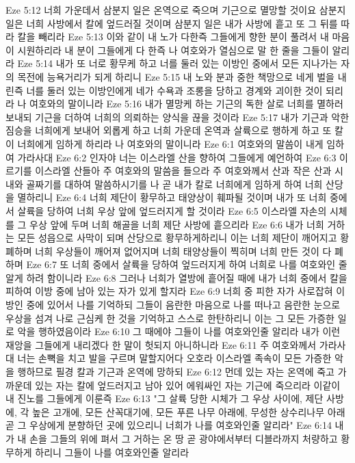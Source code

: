 Eze 5:12  너희 가운데서 삼분지 일은 온역으로 죽으며 기근으로 멸망할 것이요 삼분지 일은 너희 사방에서 칼에 엎드러질 것이며 삼분지 일은 내가 사방에 흩고 또 그 뒤를 따라 칼을 빼리라
Eze 5:13  이와 같이 내 노가 다한즉 그들에게 향한 분이 풀려서 내 마음이 시원하리라 내 분이 그들에게 다 한즉 나 여호와가 열심으로 말 한 줄을 그들이 알리라
Eze 5:14  내가 또 너로 황무케 하고 너를 둘러 있는 이방인 중에서 모든 지나가는 자의 목전에 능욕거리가 되게 하리니
Eze 5:15  내 노와 분과 중한 책망으로 네게 벌을 내린즉 너를 둘러 있는 이방인에게 네가 수욕과 조롱을 당하고 경계와 괴이한 것이 되리라 나 여호와의 말이니라
Eze 5:16  내가 멸망케 하는 기근의 독한 살로 너희를 멸하러 보내되 기근을 더하여 너희의 의뢰하는 양식을 끊을 것이라
Eze 5:17  내가 기근과 악한 짐승을 너희에게 보내어 외롭게 하고 너희 가운데 온역과 살륙으로 행하게 하고 또 칼이 너희에게 임하게 하리라 나 여호와의 말이니라
Eze 6:1  여호와의 말씀이 내게 임하여 가라사대
Eze 6:2  인자야 너는 이스라엘 산을 향하여 그들에게 예언하여
Eze 6:3  이르기를 이스라엘 산들아 주 여호와의 말씀을 들으라 주 여호와께서 산과 작은 산과 시내와 골짜기를 대하여 말씀하시기를 나 곧 내가 칼로 너희에게 임하게 하여 너희 산당을 멸하리니
Eze 6:4  너희 제단이 황무하고 태양상이 훼파될 것이며 내가 또 너희 중에서 살륙을 당하여 너희 우상 앞에 엎드러지게 할 것이라
Eze 6:5  이스라엘 자손의 시체를 그 우상 앞에 두며 너희 해골을 너희 제단 사방에 흩으리라
Eze 6:6  내가 너희 거하는 모든 성읍으로 사막이 되며 산당으로 황무하게하리니 이는 너희 제단이 깨어지고 황폐하며 너희 우상들이 깨어져 없어지며 너희 태양상들이 찍히며 너희 만든 것이 다 폐하며
Eze 6:7  또 너희 중에서 살륙을 당하여 엎드러지게 하여 너희로 나를 여호와인 줄 알게 하려 함이니라
Eze 6:8  그러나 너희가 열방에 흩어질 때에 내가 너희 중에서 칼을 피하여 이방 중에 남아 있는 자가 있게 할지라
Eze 6:9  너희 중 피한 자가 사로잡혀 이방인 중에 있어서 나를 기억하되 그들이 음란한 마음으로 나를 떠나고 음란한 눈으로 우상을 섬겨 나로 근심케 한 것을 기억하고 스스로 한탄하리니 이는 그 모든 가증한 일로 악을 행하였음이라
Eze 6:10  그 때에야 그들이 나를 여호와인줄 알리라 내가 이런 재앙을 그들에게 내리겠다 한 말이 헛되지 아니하니라
Eze 6:11  주 여호와께서 가라사대 너는 손뼉을 치고 발을 구르며 말할지어다 오호라 이스라엘 족속이 모든 가증한 악을 행하므로 필경 칼과 기근과 온역에 망하되
Eze 6:12  먼데 있는 자는 온역에 죽고 가까운데 있는 자는 칼에 엎드러지고 남아 있어 에워싸인 자는 기근에 죽으리라 이같이 내 진노를 그들에게 이룬즉
Eze 6:13  "그 살륙 당한 시체가 그 우상 사이에, 제단 사방에, 각 높은 고개에, 모든 산꼭대기에, 모든 푸른 나무 아래에, 무성한 상수리나무 아래 곧 그 우상에게 분향하던 곳에 있으리니 너희가 나를 여호와인줄 알리라"
Eze 6:14  내가 내 손을 그들의 위에 펴서 그 거하는 온 땅 곧 광야에서부터 디블라까지 처량하고 황무하게 하리니 그들이 나를 여호와인줄 알리라
